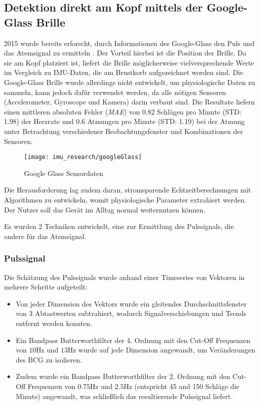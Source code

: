 \subsection{Detektion direkt am Kopf mittels der Google-Glass Brille}
2015 wurde bereits erforscht, durch Informationen des Google-Glass den Puls und das Atemsignal zu ermitteln \cite{hernandezCardiacRespiratoryParameter}. 
Der Vorteil hierbei ist die Position der Brille. 
Da sie am Kopf platziert ist, liefert die Brille möglicherweise vielversprechende Werte im Vergleich zu IMU-Daten, die am Brustkorb aufgezeichnet worden sind.
Die Google-Glass Brille wurde allerdings nicht entwickelt, um physiologische Daten zu sammeln, kann jedoch dafür verwendet werden, da alle nötigen Sensoren (Accelerometer, Gyroscope und Kamera) darin verbaut sind.
Die Resultate liefern einen mittleren absoluten Fehler (\textit{MAE}) von 0.82 Schlägen pro Minute (STD: 1.98) der Herzrate und 0.6 Atmungen pro Minute (STD: 1.19) bei der Atmung unter Betrachtung verschiedener Beobachtungsfenster und Kombinationen der Sensoren. 
\begin{figure}[ht]
    \centering
    \texttt{[image: imu\_research/googleGlass]}
    \caption{Google Glass Sensordaten \cite{hernandezCardiacRespiratoryParameter}}
    \label{imu_research_google_glass}
\end{figure}
Die Herausforderung lag zudem daran, stromsparende Echtzeitberechnungen mit Algorithmen zu entwickeln, womit physiologische Parameter extrahiert werden. Der Nutzer soll das Gerät im Alltag normal weiternutzen können. 

Es wurden 2 Techniken entwickelt, eine zur Ermittlung des Pulssignals, die andere für das Atemsignal.
\subsubsection{Pulssignal}
Die Schätzung des Pulssignals wurde anhand einer Timeseries von Vektoren in mehrere Schritte aufgeteilt:
\begin{itemize}
    \item Von jeder Dimension des Vektors wurde ein gleitendes Durchschnittsfenster von 3 Abtastwerten subtrahiert, wodurch Signalverschiebungen und Trends entfernt werden konnten.
    \item Ein Bandpass Butterworthfilter der 4. Ordnung mit den Cut-Off Frequenzen von $10 \si{\hertz}$ und $13 \si{\hertz}$ wurde auf jede Dimension angewandt, um Veränderungen des BCG zu isolieren.
    \item Zudem wurde ein Bandpass Butterworthfilter der 2. Ordnung mit den Cut-Off Frequenzen von $0.75 \si{\hertz}$ und $2.5 \si{\hertz}$ (entspricht 45 and 150 Schläge die Minute) angewandt, was schließlich das resultierende Pulssignal liefert.
\end{itemize}

